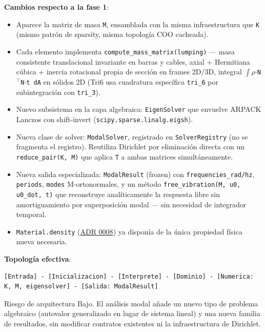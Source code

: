 \documentclass[11pt,oneside]{report}
\begin{document}
\textbf{Cambios respecto a la fase 1}:

\begin{itemize}
  \item Aparece la matriz de masa \texttt{M}, ensamblada con la misma infraestructura que \texttt{K} (mismo patrón de sparsity, misma topología COO cacheada).
  \item Cada elemento implementa \texttt{compute\_\allowbreak{}mass\_\allowbreak{}matrix(lumping)} --- masa consistente translacional invariante en barras y cables, axial + Hermitiana cúbica + inercia rotacional propia de sección en frames 2D/3D, integral \texttt{\ensuremath{\int}\ensuremath{\rho}\ensuremath{\cdot}N\ensuremath{^{\top}}N\ensuremath{\cdot}t dA} en sólidos 2D (Tri6 usa cuadratura específica \texttt{tri\_6} por subintegración con \texttt{tri\_3}).
  \item Nuevo subsistema en la capa algebraica: \texttt{EigenSolver} que envuelve ARPACK Lanczos con shift-invert (\texttt{scipy.\allowbreak{}sparse.\allowbreak{}linalg.\allowbreak{}eigsh}).
  \item Nueva clase de solver: \texttt{ModalSolver}, registrado en \texttt{SolverRegistry} (no se fragmenta el registro). Reutiliza Dirichlet por eliminación directa con un \texttt{reduce\_\allowbreak{}pair(K, M)} que aplica \texttt{T} a ambas matrices simultáneamente.
  \item Nueva salida especializada: \texttt{ModalResult} (frozen) con \texttt{frequencies\_\allowbreak{}rad/\allowbreak{}hz}, \texttt{periods}, \texttt{modes} M-ortonormales, y un método \texttt{free\_\allowbreak{}vibration(M, u0, u0\_\allowbreak{}dot, t)} que reconstruye analíticamente la respuesta libre sin amortiguamiento por superposición modal --- sin necesidad de integrador temporal.
  \item \texttt{Material.density} (\hyperref[adr:0008]{ADR 0008}) ya disponía de la única propiedad física nueva necesaria.
\end{itemize}

\textbf{Topología efectiva}:

\begin{lstlisting}
[Entrada] - [Inicializacion] - [Interprete] - [Dominio] - [Numerica: K, M, eigensolver] - [Salida: ModalResult]

\end{lstlisting}

\begin{infobox}{Riesgo de arquitectura}
Bajo. El análisis modal añade un nuevo tipo de problema algebraico (autovalor generalizado en lugar de sistema lineal) y una nueva familia de resultados, sin modificar contratos existentes ni la infraestructura de Dirichlet.
\end{infobox}
\end{document}
